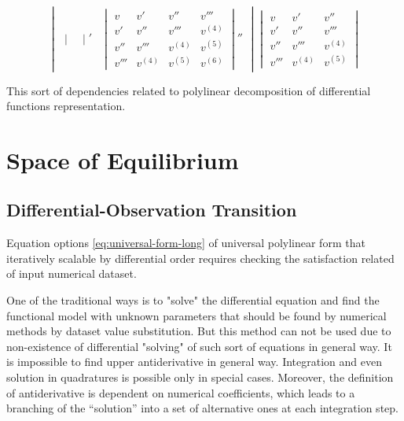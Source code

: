 \documentclass[a4paper, 11pt, oneside]{book}
\begin{document}
\begin{equation}
{\begin{vmatrix}
\begin{vmatrix}
    \end{vmatrix}' & 
    \begin{vmatrix}
      v & v' & v'' & v''' \\
      v' & v'' & v''' & v^{(4)} \\
      v'' & v''' & v^{(4)} & v^{(5)} \\
      v''' & v^{(4)} & v^{(5)} & v^{(6)}
    \end{vmatrix}''
  \end{vmatrix}
  }{
    \begin{vmatrix}
      v & v' & v'' \\
      v' & v'' & v''' \\
      v'' & v''' & v^{(4)} \\
      v''' & v^{(4)} & v^{(5)}
    \end{vmatrix} 
  }
\end{equation}

This sort of dependencies related to polylinear decomposition of differential functions representation.

\chapter{Space of Equilibrium}
\pagestyle{fancy}
\fancyhf{}
\lhead{\bfseries\leftmark}
\rhead{\bfseries\rightmark}
\fancyfoot{}
\fancyfoot[R]{\thepage}

\section{Differential-Observation Transition}
Equation options \ref{eq:universal-form-long} of universal polylinear form that iteratively scalable by differential order requires checking the satisfaction related of input numerical dataset.

One of the traditional ways is to "solve" the differential equation and find the functional model with unknown parameters that should be found by numerical methods by dataset value substitution. But this method can not be used due to non-existence of differential "solving" of such sort of equations in general way. It is impossible to find upper antiderivative in general way. Integration and even solution in quadratures is possible only in special cases. Moreover, the definition of antiderivative is dependent on numerical coefficients, which leads to a branching of the “solution” into a set of alternative ones at each integration step.
\end{document}
